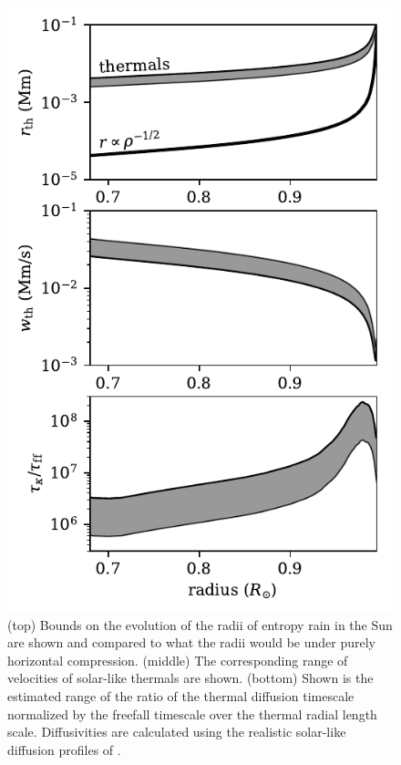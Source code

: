 \documentclass[twocolumn, amsmath, amsfonts, amssymb, trackchanges]{aastex62}
\begin{document}
\begin{figure}[t!]
    \includegraphics[width=\columnwidth]{thermal_sun_comparison.pdf}
    \caption{
	(top) Bounds on the evolution of the radii of entropy rain in the Sun are shown and compared to what the radii would be under purely horizontal compression.
	(middle) The corresponding range of velocities of solar-like thermals are shown. 
	(bottom) Shown is the estimated range of the ratio of the thermal diffusion timescale normalized by the freefall timescale over the thermal radial length scale.
	Diffusivities are calculated using the realistic solar-like diffusion profiles of \citet{brown2011}.
    \label{fig:thermal_sun_comparison} }
\end{figure}
\end{document}
